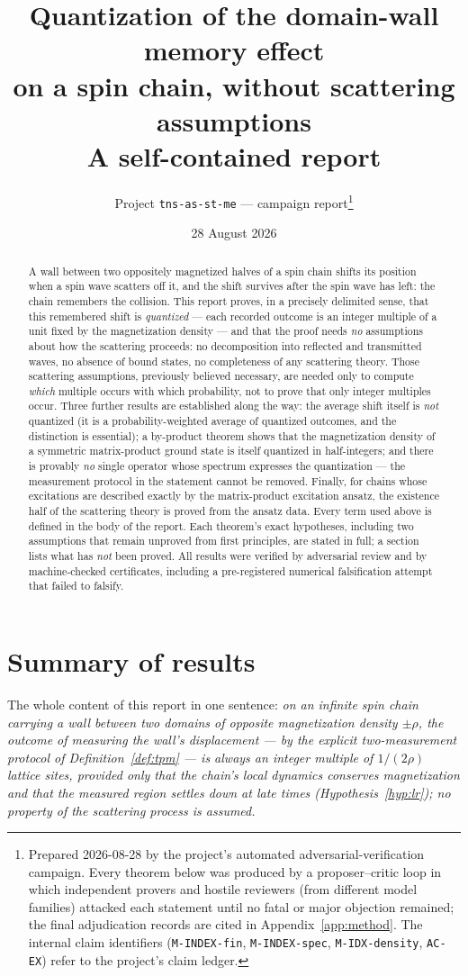 \documentclass[11pt]{article}
\title{Quantization of the domain-wall memory effect\\ on a spin chain, without scattering assumptions\\[1ex]
\large A self-contained report}
\author{Project \texttt{tns-as-st-me} --- campaign report\thanks{Prepared 2026-08-28 by the
project's automated adversarial-verification campaign.  Every theorem below was
produced by a proposer--critic loop in which independent provers and hostile
reviewers (from different model families) attacked each statement until no
fatal or major objection remained; the final adjudication records are cited in
Appendix~\ref{app:method}.  The internal claim identifiers
(\texttt{M-INDEX-fin}, \texttt{M-INDEX-spec}, \texttt{M-IDX-density},
\texttt{AC-EX}) refer to the project's claim ledger.}}
\date{28 August 2026}
\theoremstyle{definition}
\theoremstyle{remark}
\begin{document}
\maketitle

\begin{abstract}
\noindent
A wall between two oppositely magnetized halves of a spin chain shifts its
position when a spin wave scatters off it, and the shift survives after the
spin wave has left: the chain remembers the collision.  This report proves,
in a precisely delimited sense, that this remembered shift is \emph{quantized}
--- each recorded outcome is an integer multiple of a unit fixed by the
magnetization density --- and that the proof needs \emph{no} assumptions about
how the scattering proceeds: no decomposition into reflected and transmitted
waves, no absence of bound states, no completeness of any scattering theory.
Those scattering assumptions, previously believed necessary, are needed only
to compute \emph{which} multiple occurs with which probability, not to prove
that only integer multiples occur.  Three further results are established
along the way: the average shift itself is \emph{not} quantized (it is a
probability-weighted average of quantized outcomes, and the distinction is
essential); a by-product theorem shows that the magnetization density of a
symmetric matrix-product ground state is itself quantized in half-integers;
and there is provably \emph{no} single operator whose spectrum expresses the
quantization --- the measurement protocol in the statement cannot be removed.
Finally, for chains whose excitations are described exactly by the
matrix-product excitation ansatz, the existence half of the scattering theory
is proved from the ansatz data.  Every term used above is defined in the body
of the report.  Each theorem's exact hypotheses, including two assumptions
that remain unproved from first principles, are stated in full; a section
lists what has \emph{not} been proved.  All results were verified by
adversarial review and by machine-checked certificates, including a
pre-registered numerical falsification attempt that failed to falsify.
\end{abstract}

\tableofcontents

\section{Summary of results}\label{sec:summary}

The whole content of this report in one sentence: \emph{on an infinite spin
chain carrying a wall between two domains of opposite magnetization density
$\pm\rho$, the outcome of measuring the wall's displacement --- by the
explicit two-measurement protocol of Definition~\ref{def:tpm} --- is always an
integer multiple of $1/(2\rho)$ lattice sites, provided only that the chain's
local dynamics conserves magnetization and that the measured region settles
down at late times (Hypothesis~\ref{hyp:lr}); no property of the scattering
process is assumed.}
\end{document}
